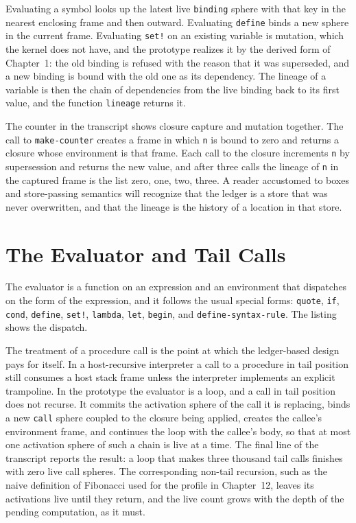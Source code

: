 \documentclass[11pt,oneside]{report}
\theoremstyle{plain}
\theoremstyle{definition}
\theoremstyle{remark}
\newcommand{\code}[2][Python]{}
\newcommand{\transcript}[1]{}
\begin{document}
Evaluating a symbol looks up the latest live \texttt{binding} sphere with that key in the nearest enclosing frame and then outward. Evaluating \texttt{define} binds a new sphere in the current frame. Evaluating \texttt{set!} on an existing variable is mutation, which the kernel does not have, and the prototype realizes it by the derived form of Chapter~1: the old binding is refused with the reason that it was superseded, and a new binding is bound with the old one as its dependency. The lineage of a variable is then the chain of dependencies from the live binding back to its first value, and the function \texttt{lineage} returns it.

\code{ex_lisp_env}

The counter in the transcript shows closure capture and mutation together. The call to \texttt{make-counter} creates a frame in which \texttt{n} is bound to zero and returns a closure whose environment is that frame. Each call to the closure increments \texttt{n} by supersession and returns the new value, and after three calls the lineage of \texttt{n} in the captured frame is the list zero, one, two, three. A reader accustomed to boxes and store-passing semantics will recognize that the ledger is a store that was never overwritten, and that the lineage is the history of a location in that store.

\transcript{lisp}

\section{The Evaluator and Tail Calls}

The evaluator is a function on an expression and an environment that dispatches on the form of the expression, and it follows the usual special forms: \texttt{quote}, \texttt{if}, \texttt{cond}, \texttt{define}, \texttt{set!}, \texttt{lambda}, \texttt{let}, \texttt{begin}, and \texttt{define-syntax-rule}. The listing shows the dispatch.

\code{ex_lisp_eval}

The treatment of a procedure call is the point at which the ledger-based design pays for itself. In a host-recursive interpreter a call to a procedure in tail position still consumes a host stack frame unless the interpreter implements an explicit trampoline. In the prototype the evaluator is a loop, and a call in tail position does not recurse. It commits the activation sphere of the call it is replacing, binds a new \texttt{call} sphere coupled to the closure being applied, creates the callee's environment frame, and continues the loop with the callee's body, so that at most one activation sphere of such a chain is live at a time. The final line of the transcript reports the result: a loop that makes three thousand tail calls finishes with zero live call spheres. The corresponding non-tail recursion, such as the naive definition of Fibonacci used for the profile in Chapter~12, leaves its activations live until they return, and the live count grows with the depth of the pending computation, as it must.
\end{document}
